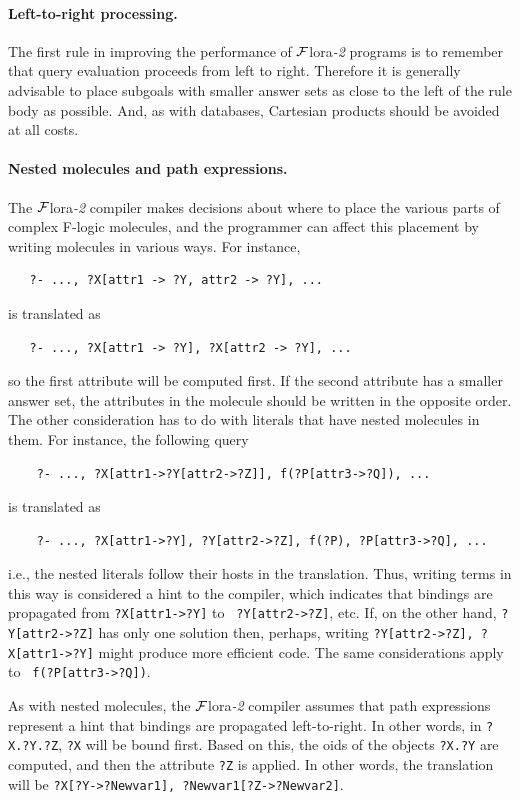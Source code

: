 \documentclass[11pt]{article}
\newcommand{\FLORA}{{\mbox{\sc ${\cal F}${lora}\rm\emph{-2}}}\xspace}
\begin{document}
\paragraph{Left-to-right processing.}
The first rule in improving the performance of \FLORA programs is to
remember that query evaluation proceeds from left to right. Therefore it is
generally advisable to place subgoals with smaller answer sets as close to
the left of the rule body as possible. And, as with databases, Cartesian
products should be avoided at all costs.

\paragraph{Nested molecules and path expressions.}
The \FLORA compiler makes decisions about
where to place the various parts of complex F-logic molecules, and the
programmer can affect this placement by writing molecules in various ways.
For instance,
\begin{verbatim}
   ?- ..., ?X[attr1 -> ?Y, attr2 -> ?Y], ...
\end{verbatim}
is translated as
\begin{verbatim}
   ?- ..., ?X[attr1 -> ?Y], ?X[attr2 -> ?Y], ...  
\end{verbatim}
so the first attribute will be computed first. If the second attribute has
a smaller answer set, the attributes in the molecule should be written in
the opposite order. The other consideration has to do with literals that
have nested molecules in them. For instance, the following query
\begin{verbatim}
    ?- ..., ?X[attr1->?Y[attr2->?Z]], f(?P[attr3->?Q]), ...
\end{verbatim}
is translated as
\begin{verbatim}
    ?- ..., ?X[attr1->?Y], ?Y[attr2->?Z], f(?P), ?P[attr3->?Q], ...
\end{verbatim}
i.e., the nested literals follow their hosts in the translation.
Thus, writing terms in this way is considered a hint to the compiler, which
indicates that bindings are propagated from {\tt ?X[attr1->?Y]} to {\tt
  ?Y[attr2->?Z]}, etc. If, on the other hand, {\tt ?Y[attr2->?Z]} has only one
solution then, perhaps, writing {\tt ?Y[attr2->?Z], ?X[attr1->?Y]} might
produce more efficient code.  The same considerations apply to {\tt
  f(?P[attr3->?Q])}.

As with nested molecules, the \FLORA compiler assumes that path
expressions represent a hint that bindings are propagated left-to-right.
In other words, in {\tt ?X.?Y.?Z}, {\tt ?X} will be bound first.
Based on this, the oids of the objects {\tt ?X.?Y} are computed, and
then the attribute {\tt ?Z} is applied. In other words, the translation will
be {\tt ?X[?Y->?Newvar1], ?Newvar1[?Z->?Newvar2]}.
\end{document}
